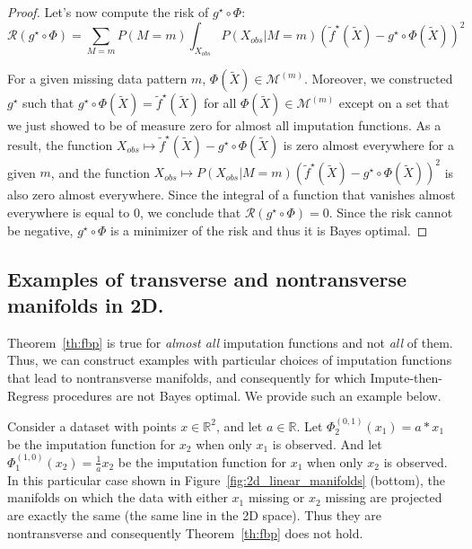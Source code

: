 \documentclass{article}
\newcommand{\Mcal}{\mathcal{M}}
\newcommand{\Rcal}{\mathcal{R}}
\newcommand{\br}[1]{\left(#1\right)}
\theoremstyle{plain}
\begin{document}
\begin{proof}
    Let's now compute the risk of $g^\star \circ \Phi$:
    \begin{equation}
        \Rcal(g^\star \circ \Phi) = \sum_{M = m} P(M=m) \int_{X_{obs}} P(X_{obs}| M=m) \br{ \tilde f^\star(\widetilde X) - g^\star \circ \Phi(\widetilde X)}^2
    \end{equation}
    
    For a given missing data pattern $m$, $\Phi(\widetilde X) \in \Mcal^{(m)}$. Moreover, we constructed $g^\star$ such that $g^\star \circ \Phi(\widetilde X) = \tilde f^\star (\widetilde X)$ for all $\Phi(\widetilde X) \in \Mcal^{(m)}$ except on a set that we just showed to be of measure zero for almost all imputation functions. As a result, the function $X_{obs} \mapsto \tilde f^\star(\widetilde X) - g^\star \circ \Phi(\widetilde X)$ is zero almost everywhere for a given $m$, and the function $X_{obs} \mapsto P(X_{obs}| M=m) \br{ \tilde f^\star(\widetilde X) - g^\star \circ \Phi(\widetilde X)}^2$ is also zero almost everywhere. Since the integral of a function that vanishes almost everywhere is equal to 0, we conclude that $\Rcal(g^\star \circ \Phi) = 0$. Since the risk cannot be negative, $g^\star \circ \Phi$ is a minimizer of the risk and thus it is Bayes optimal.
\end{proof}

\subsection{Examples of transverse and nontransverse manifolds in 2D.}
\label{ss:2D_manifolds}
Theorem~\ref{th:fbp} is true for \emph{almost all} imputation functions and not \emph{all} of them. Thus, we can construct examples with particular choices of imputation functions that lead to nontransverse manifolds, and consequently for which Impute-then-Regress procedures are not Bayes optimal. We provide such an example below.

Consider a dataset with points $x \in \mathbb R^2$, and let $a \in \mathbb R$. Let $\Phi^{(0, 1)}_2(x_1) = a*x_1$ be the imputation function for $x_2$ when only $x_1$ is observed. And let $\Phi^{(1, 0)}_1(x_2) = \frac{1}{a}x_2$ be the imputation function for $x_1$ when only $x_2$ is observed. In this particular case shown in Figure~\ref{fig:2d_linear_manifolds} (bottom), the manifolds on which the data with either $x_1$ missing or $x_2$ missing are projected are exactly the same (the same line in the 2D space). Thus they are nontransverse and consequently Theorem~\ref{th:fbp} does not hold.
\end{document}
